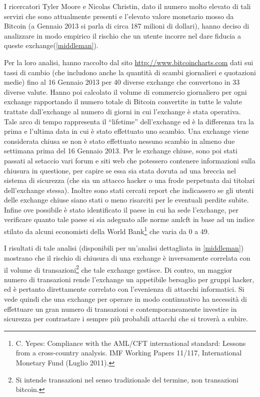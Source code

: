 I ricercatori Tyler Moore e Nicolas Christin, dato il numero molto elevato di tali servizi che sono attualmente presenti e l'elevato valore monetario mosso da Bitcoin (a Gennaio 2013 si parla di circa 187 milioni di dollari), hanno deciso di analizzare in modo empirico il rischio che un utente incorre nel dare fiducia a queste exchange(\ref{middleman}).

Per la loro analisi, hanno raccolto dal sito \url{http://www.bitcoincharts.com} dati sui tassi di cambio (che includono anche la quantità di scambi giornalieri e quotazioni medie) fino al 16 Gennaio 2013 per 40 diverse exchange che convertono in 33 diverse valute.
Hanno poi calcolato il volume di commercio giornaliero per ogni exchange rapportando il numero totale di Bitcoin convertite in tutte le valute trattate dall'exchange al numero di giorni in cui l'exchange è stata operativa. Tale arco di tempo rappresenta il ``lifetime'' dell'exchange ed è la differenza tra la prima e l'ultima data in cui è stato effettuato uno scambio. Una exchange viene considerata chiusa se non è stato effettuato nessuno scambio in almeno due settimana prima del 16 Gennaio 2013.
Per le exchange chiuse, sono poi stati passati al setaccio vari forum e siti web che potessero contenere informazioni sulla chiusura in questione, per capire se essa sia stata dovuta ad una breccia nel sistema di sicurezza (che sia un attacco hacker o una frode perpetuata dai titolari dell'exchange stessa). Inoltre sono stati cercati report che indicassero se gli utenti delle exchange chiuse siano stati o meno risarciti per le eventuali perdite subite.
Infine ove possibile è stato identificato il paese in cui ha sede l'exchange, per verificare quanto tale paese si sia adeguato alle norme \gls{amlcft} in base ad un indice stilato da alcuni economisti della World Bank\footnote{C. Yepes: Compliance with the AML/CFT international standard: Lessons from a cross-country analysis. IMF Working Papers 11/117, International Monetary Fund (Luglio 2011).} che varia da 0 a 49.

I risultati di tale analisi (disponibili per un'analisi dettagliata in \ref{middleman}) mostrano che il rischio di chiusura di una exchange è inversamente correlata con il volume di transazioni\footnote{Si intende transazioni nel senso tradizionale del termine, non transazioni bitcoin.} che tale exchange gestisce. Di contro, un maggior numero di transazioni rende l'exchange un appetibile bersaglio per gruppi hacker, ed è pertanto direttamente correlato con l'evenienza di attacchi informatici.
Si vede quindi che una exchange per operare in modo continuativo ha necessità di effettuare un gran numero di transazioni e contemporaneamente investire in sicurezza per contrastare i sempre più probabili attacchi che si troverà a subire.

